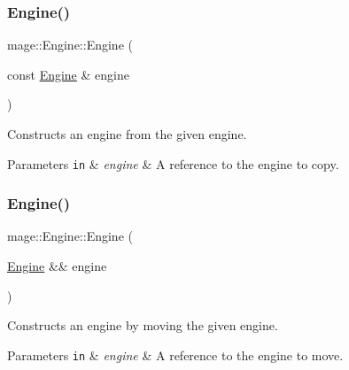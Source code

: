 \subsubsection{\texorpdfstring{Engine()}{Engine()}\hspace{0.1cm}{\footnotesize\ttfamily [2/3]}}
{\footnotesize\ttfamily mage\+::\+Engine\+::\+Engine (\begin{DoxyParamCaption}\item[{const \hyperlink{classmage_1_1_engine}{Engine} \&}]{engine }\end{DoxyParamCaption})\hspace{0.3cm}{\ttfamily [delete]}}

Constructs an engine from the given engine.


\begin{DoxyParams}[1]{Parameters}
\mbox{\tt in}  & {\em engine} & A reference to the engine to copy. \\
\hline
\end{DoxyParams}
\hypertarget{classmage_1_1_engine_a69ee5a698bf54da107ebaa7839812840}{}\label{classmage_1_1_engine_a69ee5a698bf54da107ebaa7839812840} 
\subsubsection{\texorpdfstring{Engine()}{Engine()}\hspace{0.1cm}{\footnotesize\ttfamily [3/3]}}
{\footnotesize\ttfamily mage\+::\+Engine\+::\+Engine (\begin{DoxyParamCaption}\item[{\hyperlink{classmage_1_1_engine}{Engine} \&\&}]{engine }\end{DoxyParamCaption})\hspace{0.3cm}{\ttfamily [default]}}

Constructs an engine by moving the given engine.


\begin{DoxyParams}[1]{Parameters}
\mbox{\tt in}  & {\em engine} & A reference to the engine to move. \\
\hline
\end{DoxyParams}
\hypertarget{classmage_1_1_engine_a34628556f8397d70ed018d71e343c2f5}{}\label{classmage_1_1_engine_a34628556f8397d70ed018d71e343c2f5} 
